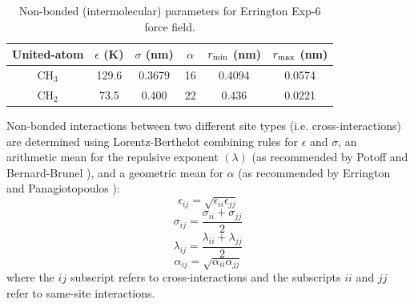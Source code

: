 \documentclass[journal=jctc,manuscript=article]{achemso}
\begin{document}
\begin{table}[h!]
	\caption{Non-bonded (intermolecular) parameters for Errington Exp-6 force field.} \label{tab:nonbonded Exp6}
	\begin{center}
		\begin{tabular}{|c|c|c|c|c|c|}
			\hline
			United-atom & $\epsilon$ (K) & $\sigma$ (nm) & $\alpha$ & $r_{\rm min}$ (nm) & $r_{\rm max}$ (nm)  \\ \hline
			CH$_3$ & 129.6  & 0.3679 & 16 & 0.4094 & 0.0574 \\ 
			CH$_2$ & 73.5 & 0.400 & 22 & 0.436 & 0.0221 \\ \hline
		\end{tabular}
	\end{center} 
\end{table}

Non-bonded interactions between two different site types (i.e. cross-interactions) are determined using Lorentz-Berthelot combining rules \cite{Allen1987} for $\epsilon$ and $\sigma$, an arithmetic mean for the repulsive exponent $(\lambda)$ (as recommended by Potoff and Bernard-Brunel \cite{Mie}), and a geometric mean for $\alpha$ (as recommended by Errington and Panagiotopoulos \cite{Exp6}):
\begin{equation} \label{eq:Lorentz-Berthelot_eps}
\epsilon_{ij} = \sqrt{\epsilon_{ii} \epsilon_{jj}}
\end{equation}
\begin{equation} \label{eq:Lorentz-Berthelot_sig}
\sigma_{ij} = \frac{\sigma_{ii} + \sigma_{jj}}{2}
\end{equation}
\begin{equation} \label{eq:Lorentz-Berthelot_lam}
\lambda_{ij} = \frac{\lambda_{ii} + \lambda_{jj}}{2}
\end{equation}
\begin{equation} \label{eq:Lorentz-Berthelot_alpha}
\alpha_{ij} = \sqrt{\alpha_{ii} \alpha_{jj}}
\end{equation}
where the $ij$ subscript refers to cross-interactions and the subscripts $ii$ and $jj$ refer to same-site interactions. 
\end{document}
